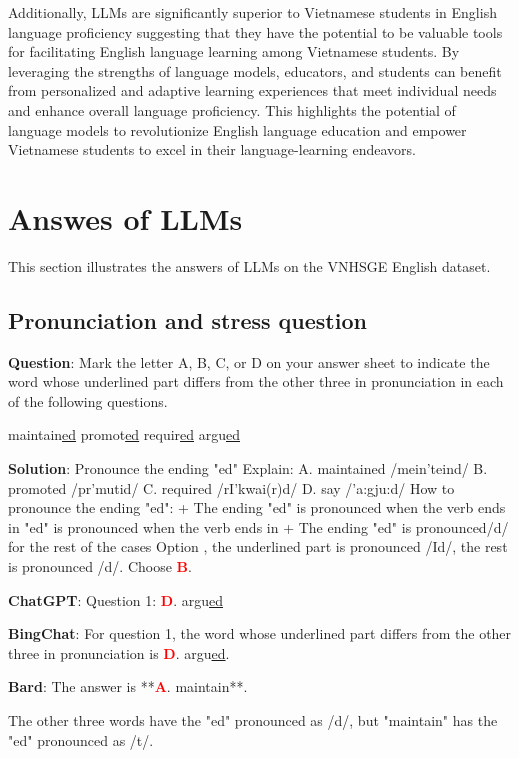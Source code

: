 \documentclass[11pt]{article}
\begin{document}
Additionally, LLMs are significantly superior to Vietnamese students in English language proficiency suggesting that they have the potential to be valuable tools for facilitating English language learning among Vietnamese students. By leveraging the strengths of language models, educators, and students can benefit from personalized and adaptive learning experiences that meet individual needs and enhance overall language proficiency. This highlights the potential of language models to revolutionize English language education and empower Vietnamese students to excel in their language-learning endeavors.




\appendix

\section{Answes of LLMs}
\label{sec:llm_a_appendix}

This section illustrates the answers of LLMs on the VNHSGE English dataset. 

\subsection{Pronunciation and stress question}



\begin{mdframed}[linewidth=1pt,linecolor=red] \textbf{Question}: Mark the letter A, B, C, or D on your answer sheet to indicate the word whose underlined part differs from the other three in pronunciation in each of the following questions.
	\begin{choices}
		\choice maintain\underline{ed} 
		\choice promot\underline{ed} 
		\choice requir\underline{ed} 	
		\choice argu\underline{ed}
	\end{choices}
	
	\textbf{Solution}: 
	Pronounce the ending "ed"
	Explain:
	A. maintained /mein'teind/
	B. promoted /pr\textschwa'm\textschwa utid/
	C. required /rI'kwai\textschwa(r)d/
	D. say /'a:gju:d/
	How to pronounce the ending "ed":
	+ The ending "ed" is pronounced  when the verb ends in   "ed" is pronounced  when the verb ends in 
	+ The ending "ed" is pronounced/d/ for the rest of the cases Option , the underlined part is pronounced /Id/, the rest is pronounced /d/.
	Choose \textcolor{red}{\textbf{B}}. 
	
	\textbf{ChatGPT}: Question 1: \textcolor{red}{\textbf{D}}. argu\underline{ed} 
	
	\textbf{BingChat}: For question 1, the word whose underlined part differs from the other three in pronunciation is \textcolor{red}{\textbf{D}}. argu\underline{ed}. 
	
	\textbf{Bard}: The answer is **\textcolor{red}{\textbf{A}}. maintain**.
	
	The other three words have the "ed" pronounced as /d/, but "maintain" has the "ed" pronounced as /t/.
		
\end{mdframed}
\end{document}
